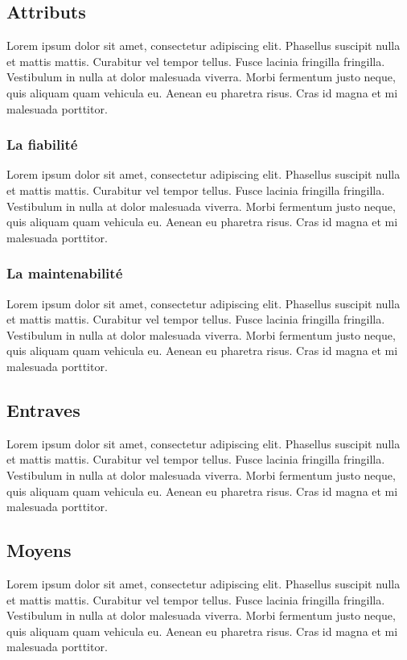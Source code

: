 \subsection{Attributs}
Lorem ipsum dolor sit amet, consectetur adipiscing elit. Phasellus suscipit nulla et mattis mattis. Curabitur vel tempor tellus. 
Fusce lacinia fringilla fringilla. Vestibulum in nulla at dolor malesuada viverra. Morbi fermentum justo neque, quis aliquam quam vehicula eu. 
Aenean eu pharetra risus. Cras id magna et mi malesuada porttitor.

\subsubsection{La fiabilité}
Lorem ipsum dolor sit amet, consectetur adipiscing elit. Phasellus suscipit nulla et mattis mattis. Curabitur vel tempor tellus. 
Fusce lacinia fringilla fringilla. Vestibulum in nulla at dolor malesuada viverra. Morbi fermentum justo neque, quis aliquam quam vehicula eu. 
Aenean eu pharetra risus. Cras id magna et mi malesuada porttitor.

\subsubsection{La maintenabilité}
Lorem ipsum dolor sit amet, consectetur adipiscing elit. Phasellus suscipit nulla et mattis mattis. Curabitur vel tempor tellus. 
Fusce lacinia fringilla fringilla. Vestibulum in nulla at dolor malesuada viverra. Morbi fermentum justo neque, quis aliquam quam vehicula eu. 
Aenean eu pharetra risus. Cras id magna et mi malesuada porttitor.

\subsection{Entraves}
Lorem ipsum dolor sit amet, consectetur adipiscing elit. Phasellus suscipit nulla et mattis mattis. Curabitur vel tempor tellus. 
Fusce lacinia fringilla fringilla. Vestibulum in nulla at dolor malesuada viverra. Morbi fermentum justo neque, quis aliquam quam vehicula eu. 
Aenean eu pharetra risus. Cras id magna et mi malesuada porttitor.

\subsection{Moyens}
Lorem ipsum dolor sit amet, consectetur adipiscing elit. Phasellus suscipit nulla et mattis mattis. Curabitur vel tempor tellus. 
Fusce lacinia fringilla fringilla. Vestibulum in nulla at dolor malesuada viverra. Morbi fermentum justo neque, quis aliquam quam vehicula eu. 
Aenean eu pharetra risus. Cras id magna et mi malesuada porttitor.

